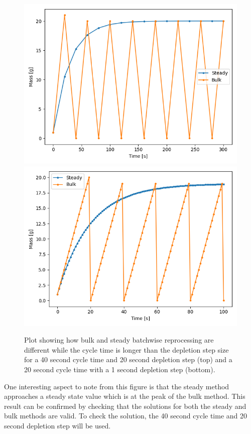 \begin{figure}[H]
  \centering
  \includegraphics[scale=0.45]{images/batch-40-20.png}
  \includegraphics[scale=0.45]{images/batch-20-1.png}
  \caption{Plot showing how bulk and steady batchwise reprocessing are different while the cycle time is longer than the depletion step size for a 40 second cycle time and 20 second depletion step (top) and a 20 second cycle time with a 1 second depletion step (bottom).}
   \label{fig:bulk_repr_diff}
\end{figure}

One interesting aspect to note from this figure is that the steady method approaches a steady state value which is at the peak of the bulk method. This result can be confirmed by checking that the solutions for both the steady and bulk methods are valid. To check the solution, the 40 second cycle time and 20 second depletion step will be used. 

